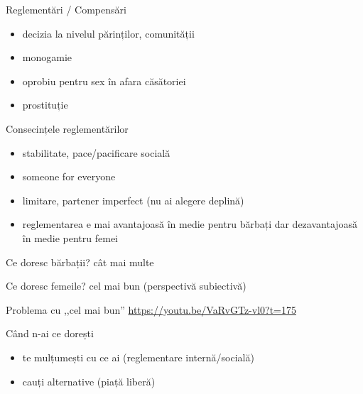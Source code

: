 \documentclass{simple}
\begin{document}
\begin{frame}{Reglementări / Compensări}
  \begin{itemize}
    \pause
    \item decizia la nivelul părinților, comunității
    \pause
    \item monogamie
    \pause
    \item oprobiu pentru sex în afara căsătoriei
    \pause
    \item prostituție
  \end{itemize}
\end{frame}

\begin{frame}{Consecințele reglementărilor}
  \begin{itemize}
    \pause
    \item stabilitate, pace/pacificare socială
    \pause
    \item someone for everyone
    \pause
    \item limitare, partener imperfect (nu ai alegere deplină)
    \pause
    \item reglementarea e mai avantajoasă în medie pentru bărbați dar dezavantajoasă în medie pentru femei
  \end{itemize}
\end{frame}

\begin{frame}{Ce doresc bărbații?}
  \centering
  \pause
  \vspace{1cm}
  \Large{cât mai multe}
\end{frame}

\begin{frame}{Ce doresc femeile?}
  \centering
  \pause
  \vspace{1cm}
  \Large{cel mai bun} (perspectivă subiectivă)
\end{frame}

\begin{frame}{Problema cu ,,cel mai bun''}
  \url{https://youtu.be/VaRvGTz-vl0?t=175}
\end{frame}

\begin{frame}{Când n-ai ce dorești}
  \begin{itemize}
    \item te mulțumești cu ce ai (reglementare internă/socială)
    \item cauți alternative (piață liberă)
  \end{itemize}
\end{frame}
\end{document}

